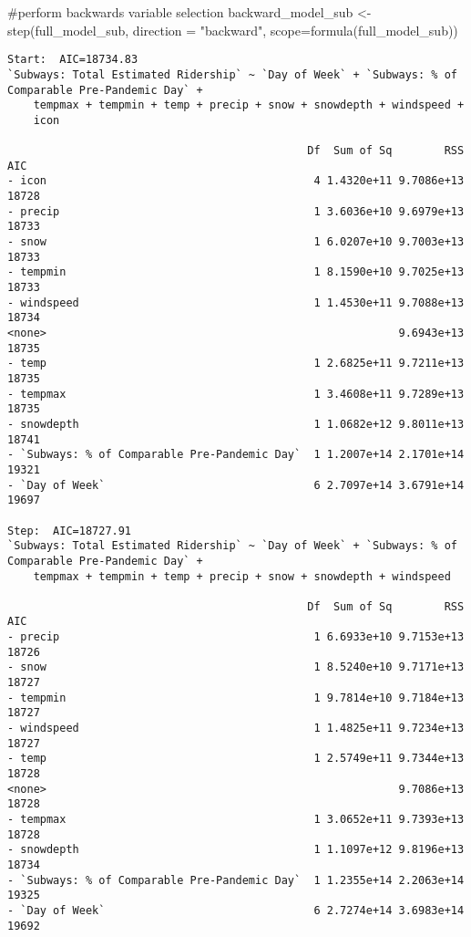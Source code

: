 \documentclass[
  letterpaper,
  DIV=11,
  numbers=noendperiod]{scrartcl}
\newenvironment{Shaded}{\begin{snugshade}}{\end{snugshade}}
\newcommand{\AttributeTok}[1]{\textcolor[rgb]{0.40,0.45,0.13}{#1}}
\newcommand{\CommentTok}[1]{\textcolor[rgb]{0.37,0.37,0.37}{#1}}
\newcommand{\FunctionTok}[1]{\textcolor[rgb]{0.28,0.35,0.67}{#1}}
\newcommand{\NormalTok}[1]{\textcolor[rgb]{0.00,0.23,0.31}{#1}}
\newcommand{\OtherTok}[1]{\textcolor[rgb]{0.00,0.23,0.31}{#1}}
\newcommand{\StringTok}[1]{\textcolor[rgb]{0.13,0.47,0.30}{#1}}
\begin{document}
\begin{Shaded}
\begin{Highlighting}[]
\CommentTok{\#perform backwards variable selection}
\NormalTok{backward\_model\_sub }\OtherTok{\textless{}{-}} \FunctionTok{step}\NormalTok{(full\_model\_sub, }\AttributeTok{direction =} \StringTok{"backward"}\NormalTok{, }\AttributeTok{scope=}\FunctionTok{formula}\NormalTok{(full\_model\_sub))}
\end{Highlighting}
\end{Shaded}

\begin{verbatim}
Start:  AIC=18734.83
`Subways: Total Estimated Ridership` ~ `Day of Week` + `Subways: % of Comparable Pre-Pandemic Day` + 
    tempmax + tempmin + temp + precip + snow + snowdepth + windspeed + 
    icon

                                              Df  Sum of Sq        RSS   AIC
- icon                                         4 1.4320e+11 9.7086e+13 18728
- precip                                       1 3.6036e+10 9.6979e+13 18733
- snow                                         1 6.0207e+10 9.7003e+13 18733
- tempmin                                      1 8.1590e+10 9.7025e+13 18733
- windspeed                                    1 1.4530e+11 9.7088e+13 18734
<none>                                                      9.6943e+13 18735
- temp                                         1 2.6825e+11 9.7211e+13 18735
- tempmax                                      1 3.4608e+11 9.7289e+13 18735
- snowdepth                                    1 1.0682e+12 9.8011e+13 18741
- `Subways: % of Comparable Pre-Pandemic Day`  1 1.2007e+14 2.1701e+14 19321
- `Day of Week`                                6 2.7097e+14 3.6791e+14 19697

Step:  AIC=18727.91
`Subways: Total Estimated Ridership` ~ `Day of Week` + `Subways: % of Comparable Pre-Pandemic Day` + 
    tempmax + tempmin + temp + precip + snow + snowdepth + windspeed

                                              Df  Sum of Sq        RSS   AIC
- precip                                       1 6.6933e+10 9.7153e+13 18726
- snow                                         1 8.5240e+10 9.7171e+13 18727
- tempmin                                      1 9.7814e+10 9.7184e+13 18727
- windspeed                                    1 1.4825e+11 9.7234e+13 18727
- temp                                         1 2.5749e+11 9.7344e+13 18728
<none>                                                      9.7086e+13 18728
- tempmax                                      1 3.0652e+11 9.7393e+13 18728
- snowdepth                                    1 1.1097e+12 9.8196e+13 18734
- `Subways: % of Comparable Pre-Pandemic Day`  1 1.2355e+14 2.2063e+14 19325
- `Day of Week`                                6 2.7274e+14 3.6983e+14 19692


\end{verbatim}
\end{document}
